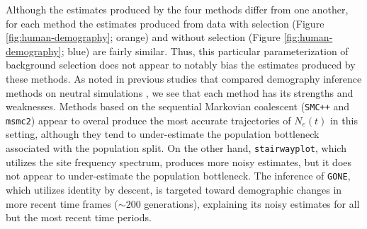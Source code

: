 \documentclass[hidelinks]{article}
\newcommand{\msmc}{\texttt{msmc2}\xspace}
\newcommand{\stairway}{\texttt{stairwayplot}\xspace}
\newcommand{\gone}{\texttt{GONE}\xspace}
\newcommand{\smcpp}{\texttt{SMC++}\xspace}
\begin{document}
    Although the estimates produced by the four methods differ from one another, 
    for each method the estimates produced from data with selection (Figure
    \ref{fig:human-demography}; orange) and without selection (Figure
    \ref{fig:human-demography}; blue) are fairly similar.
    Thus, this particular parameterization of background selection does not
    appear to notably bias the estimates produced by these methods.
    As noted in previous studies that compared demography inference methods
    on neutral simulations \citep{adrion2020community},
    we see that each method has its strengths and weaknesses.
    Methods based on the sequential Markovian coalescent (\smcpp and \msmc)
    appear to overal produce the most accurate trajectories of $N_e(t)$
    in this setting, although they tend to under-estimate the population
    bottleneck associated with the population split.
    On the other hand, \stairway, which utilizes the site frequency spectrum,
    produces more noisy estimates,
    but it does not appear to under-estimate the population bottleneck.
    The inference of \gone, which utilizes identity by descent,
    is targeted toward demographic changes in more recent time frames ($\sim 200$ generations),
    explaining its noisy estimates for all but the most recent time periods.
    
    


\end{document}
